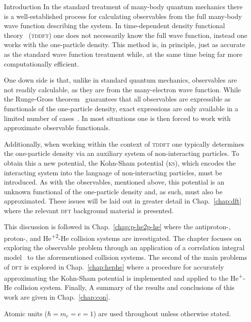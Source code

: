 \documentclass[letterpaper, 11 pt]{report}
\begin{document}
\begin{chapter}{Introduction \label{chap:intro}}
   In the standard treatment of many-body quantum mechanics there is a well-established process for
   calculating observables from the full many-body wave function describing the system. In
   time-dependent density functional theory~\cite{tddft, ullrich} (\textsc{tddft}) one does not
   necessarily know the full wave function, instead one works with the one-particle density. This
   method is, in principle, just as accurate as the standard wave function treatment while, at the
   same time being far more computationally efficient.

   One down side is that, unlike in standard quantum mechanics, observables are not readily calculable,
   as they are from the many-electron wave function. While the Runge-Gross theorem~\cite{rgt} guarantees
   that all observables are expressible as functionals of the one-particle density, exact expressions
   are only available in a limited number of cases~\cite{obs_exac}. In most situations one is then
   forced to work with approximate observable functionals.

   Additionally, when working within the context of \textsc{tddft} one typically determines the
   one-particle density via an auxiliary system of non-interacting particles. To obtain this a new
   potential, the Kohn-Sham potential (\textsc{ks}), which encodes the interacting system into the
   language of non-interacting particles, must be introduced. As with the observables, mentioned above,
   this potential is an unknown functional of the one-particle density and, as such, must also be
   approximated. These issues will be laid out in greater detail in Chap.~\ref{chap:dft} where the
   relevant \textsc{dft} background material is presented.

   This discussion is followed in Chap.~\ref{chap:p-he2p-he} where the antiproton-, proton-, and
   He\textsuperscript{+2}-He collision systems are investigated. The chapter focuses on exploring the
   observable problem through an application of a correlation integral model~\cite{wb} to the
   aforementioned collision systems. The second of the main problems of \textsc{dft} is explored in
   Chap.~\ref{chap:hephe} where a procedure for accurately approximating the Kohn-Sham potential is
   implemented and applied to the He\textsuperscript{+}-He collision system. Finally, A summary of the
   results and conclusions of this work are given in Chap.~\ref{chap:con}.

   Atomic units ($\hbar = m_e = e = 1$) are used throughout unless otherwise stated.

\end{chapter}
\end{document}
